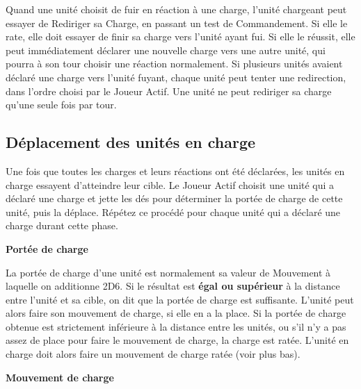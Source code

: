 Quand une unité choisit de fuir en réaction à une charge, l'unité chargeant peut essayer de Rediriger sa Charge, en passant un test de Commandement. Si elle le rate, elle doit essayer de finir sa charge vers l'unité ayant fui. Si elle le réussit, elle peut immédiatement déclarer une nouvelle charge vers une autre unité, qui pourra à son tour choisir une réaction normalement. Si plusieurs unités avaient déclaré une charge vers l'unité fuyant, chaque unité peut tenter une redirection, dans l'ordre choisi par le Joueur Actif. Une unité ne peut rediriger sa charge qu'une seule fois par tour. 

\subsection{Déplacement des unités en charge}

Une fois que toutes les charges et leurs réactions ont été déclarées, les unités en charge essayent d'atteindre leur cible. Le Joueur Actif choisit une unité qui a déclaré une charge et jette les dés pour déterminer la portée de charge de cette unité, puis la déplace. Répétez ce procédé pour chaque unité qui a déclaré une charge durant cette phase.

\noindent\textbf{Portée de charge}

La portée de charge d'une unité est normalement sa valeur de Mouvement à laquelle on additionne 2D6. Si le résultat est \textbf{égal ou supérieur} à la distance entre l'unité et sa cible, on dit que la portée de charge est suffisante. L'unité peut alors faire son mouvement de charge, si elle en a la place. Si la portée de charge obtenue est strictement inférieure à la distance entre les unités, ou s'il n'y a pas assez de place pour faire le mouvement de charge, la charge est ratée. L'unité en charge doit alors faire un mouvement de charge ratée (voir plus bas).

\newpage
\noindent\textbf{Mouvement de charge}

